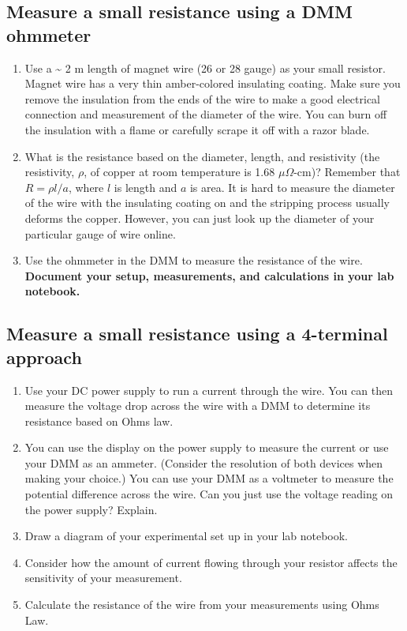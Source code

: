 \documentclass[
]{article}
\begin{document}
\hypertarget{measure-a-small-resistance-using-a-dmm-ohmmeter}{%
\subsection{Measure a small resistance using a DMM
ohmmeter}\label{measure-a-small-resistance-using-a-dmm-ohmmeter}}

\begin{enumerate}
\def\labelenumi{\arabic{enumi}.}
\item
  Use a \textasciitilde{} 2 m length of magnet wire (26 or 28 gauge) as
  your small resistor. Magnet wire has a very thin amber-colored
  insulating coating. Make sure you remove the insulation from the ends
  of the wire to make a good electrical connection and measurement of
  the diameter of the wire. You can burn off the insulation with a flame
  or carefully scrape it off with a razor blade.
\item
  What is the resistance based on the diameter, length, and resistivity
  (the resistivity, \(\rho\), of copper at room temperature is 1.68
  \(\mu\Omega\)-cm)? Remember that \(R = \rho l/a\), where \(l\) is
  length and \(a\) is area. It is hard to measure the diameter of the
  wire with the insulating coating on and the stripping process usually
  deforms the copper. However, you can just look up the diameter of your
  particular gauge of wire online.
\item
  Use the ohmmeter in the DMM to measure the resistance of the wire.
  \textbf{Document your setup, measurements, and calculations in your
  lab notebook.}
\end{enumerate}

\hypertarget{measure-a-small-resistance-using-a-4-terminal-approach}{%
\subsection{Measure a small resistance using a 4-terminal
approach}\label{measure-a-small-resistance-using-a-4-terminal-approach}}

\begin{enumerate}
\def\labelenumi{\arabic{enumi}.}
\item
  Use your DC power supply to run a current through the wire. You can
  then measure the voltage drop across the wire with a DMM to determine
  its resistance based on Ohms law.
\item
  You can use the display on the power supply to measure the current or
  use your DMM as an ammeter. (Consider the resolution of both devices
  when making your choice.) You can use your DMM as a voltmeter to
  measure the potential difference across the wire. Can you just use the
  voltage reading on the power supply? Explain.
\item
  Draw a diagram of your experimental set up in your lab notebook.
\item
  Consider how the amount of current flowing through your resistor
  affects the sensitivity of your measurement.
\item
  Calculate the resistance of the wire from your measurements using Ohms
  Law.
\end{enumerate}
\end{document}
